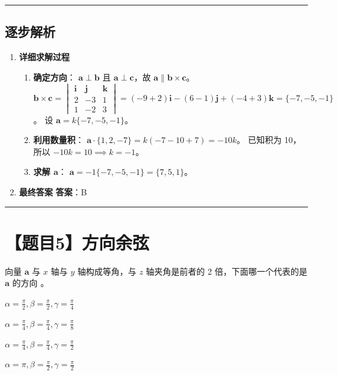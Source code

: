 \documentclass[UTF8]{ctexart}
\newenvironment{redenv}{\color{red}}{}
\newenvironment{detailedanalysis}{%
    \color{red}
    \begin{enumerate}[label=\textbf{第\arabic*步：}, leftmargin=*, align=left, itemsep=1.5ex]
}{%
    \end{enumerate}
}
\newcommand{\problemrule}{\noindent\rule{\textwidth}{1.5pt}\vspace{-0.8em}}
\newcommand{\analysisrule}{\noindent\rule{\textwidth}{0.8pt}\vspace{-0.8em}}
\newcommand{\choicesTwo}[4]{
    \begin{enumerate}[label=\Alph*., itemsep=0pt, parsep=0pt, topsep=5pt, labelsep=0.5em]
        \begin{minipage}{0.45\linewidth} \item #1 \end{minipage}
        \begin{minipage}{0.45\linewidth} \item #2 \end{minipage}
        \begin{minipage}{0.45\linewidth} \item #3 \end{minipage}
        \begin{minipage}{0.45\linewidth} \item #4 \end{minipage}
    \end{enumerate}
}
\newcommand{\blank}[1]{\underline{\hspace{#1}}}
\begin{document}
\begin{redenv}
\analysisrule
\subsection*{逐步解析}

\begin{detailedanalysis}
\item \textbf{详细求解过程}
\begin{enumerate}[label=(\arabic*)]
\item \textbf{确定方向}：
$\mathbf{a} \perp \mathbf{b}$ 且 $\mathbf{a} \perp \mathbf{c}$，故 $\mathbf{a} \parallel \mathbf{b} \times \mathbf{c}$。
$\mathbf{b} \times \mathbf{c} = \begin{vmatrix} \mathbf{i} & \mathbf{j} & \mathbf{k} \\ 2 & -3 & 1 \\ 1 & -2 & 3 \end{vmatrix} = (-9+2)\mathbf{i} - (6-1)\mathbf{j} + (-4+3)\mathbf{k} = \{-7, -5, -1\}$。
设 $\mathbf{a} = k\{-7, -5, -1\}$。
\item \textbf{利用数量积}：
$\mathbf{a} \cdot \{1, 2, -7\} = k(-7-10+7) = -10k$。
已知积为 10，所以 $-10k = 10 \implies k = -1$。
\item \textbf{求解 $\mathbf{a}$}：
$\mathbf{a} = -1 \{-7, -5, -1\} = \{7, 5, 1\}$。
\end{enumerate}

\item \textbf{最终答案}
\textbf{答案}：B
\end{detailedanalysis}
\end{redenv}

\problemrule
\section*{【题目5】方向余弦}
向量 $\mathbf{a}$ 与 $x$ 轴与 $y$ 轴构成等角，与 $z$ 轴夹角是前者的 2 倍，下面哪一个代表的是 $\mathbf{a}$ 的方向 \blank{1cm}。
\choicesTwo
{$ \alpha=\frac{\pi}{2},\beta=\frac{\pi}{2},\gamma=\frac{\pi}{4} $}
{$ \alpha=\frac{\pi}{4},\beta=\frac{\pi}{4},\gamma=\frac{\pi}{8} $}
{$ \alpha=\frac{\pi}{4},\beta=\frac{\pi}{4},\gamma=\frac{\pi}{2} $}
{$ \alpha=\pi,\beta=\frac{\pi}{2},\gamma=\frac{\pi}{2} $}
\end{document}
